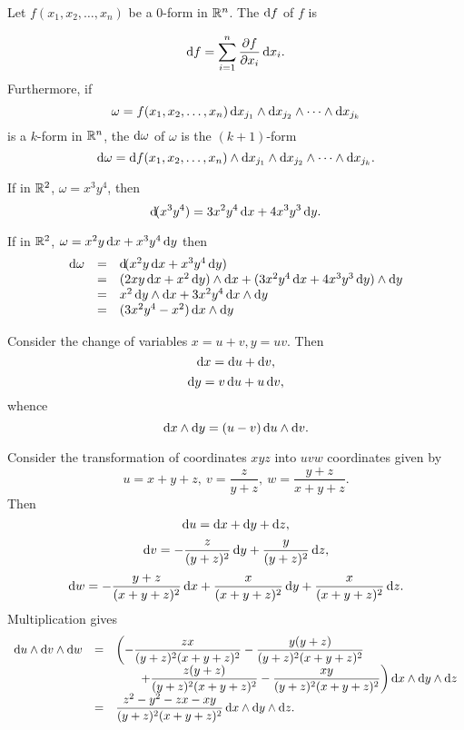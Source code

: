 \begin{df}Let $f(x_1, x_2, \ldots , x_n)$ be a $0$-form in
$\mathbb{R}^n$. The  $\d{f}$ of $f$ is

$$\d{f} = \dsum _{i = 1} ^n \dfrac{\partial f}{\partial x_i}\d{x_i}.     $$
Furthermore, if $$ \omega = f(x_1, x_2, \ldots , x_n) \d{x_{j_1}}
\wedge \d{x_{j_2}} \wedge \cdots \wedge \d{x_{j_k}}
$$is a $k$-form in $\mathbb{R}^n$, the  $\d{\omega}$ of $\omega$ is the $(k +
1 )$-form
$$ \d{\omega} = \d{f(x_1, x_2, \ldots , x_n)} \wedge \d{x_{j_1}} \wedge
\d{x_{j_2}} \wedge \cdots \wedge \d{x_{j_k}}.
                   $$
\end{df}
\begin{exa}
If in $\mathbb{R}^2$, $\omega = x^3y^4$, then
$$\d (x^3y^4) = 3x^2y^4\d{x}+ 4x^3y^3\d{y}.$$
\end{exa}
\begin{exa}
If in $\mathbb{R}^2$, $\omega = x^2y\d{x}+ x^3y^4\d{y}$ then
$$\begin{array}{lll}
\d{\omega} & = & \d (x^2y\d{x}+ x^3y^4\d{y}) \\
& = & (2xy\d{x}+ x^2\d{y})\wedge \d{x}+ (3x^2y^4\d{x}+ 4x^3y^3\d{y})\wedge \d{y} \\
& = & x^2 \d{y} \wedge \d{x}+ 3x^2y^4\d{x}\wedge \d{y} \\
& = & (3x^2y^4 - x^2)\d{x}\wedge \d{y} \\
\end{array}$$
\end{exa}

\begin{exa}
Consider the change of variables $x = u + v, y = uv$. Then
$$\d{x}= \d{u}+\d{v},$$
$$\d{y}  = v\d{u}+ u\d v,$$whence
$$\d{x}\wedge \d{y} = (u - v) \d{u}\wedge\d{v}.$$
\end{exa}
\begin{exa}
Consider the transformation of coordinates $xyz$ into $uvw$
coordinates given by
$$u = x + y + z,\  v = \dfrac{z}{y + z},\  w = \dfrac{y + z}{x + y + z}.$$
Then
$$\d{u}= \d{x}+ \d{y} + \d{z},$$
$$\d v = -\dfrac{z}{(y + z)^2}\d{y} + \dfrac{y}{(y + z)^2}\d{z},
$$
$$\d{w} =
-\dfrac{y + z}{(x + y + z)^2}\d{x}+ \dfrac{x}{(x + y + z)^2}\d{y} +
\dfrac{x}{(x + y + z)^2}\d{z}.$$ Multiplication gives
$$\everymath{\displaystyle}{\begin{array}{lll}\d{u}\wedge\d{v} \wedge \d{w} & = & \left(-\dfrac{zx}{(y + z)^2(x + y + z)^2} -
\dfrac{y(y + z)}{(y + z)^2(x + y + z)^2} \right. \\
& & \qquad \left. + \dfrac{z(y + z)}{(y + z)^2(x + y + z)^2} -
\dfrac{xy}{(y + z)^2(x + y + z)^2} \right)\d{x}\wedge \d{y} \wedge
\d{z}
\\ &
= &\dfrac{z^2 - y^2 - zx - xy}{(y + z)^2(x + y + z)^2}\d{x}\wedge
\d{y} \wedge \d{z}. \end{array}}$$
\end{exa}

